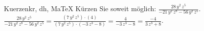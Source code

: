 \begin{MAufgabe}{Kuerzen}{kr, dh, MaTeX}
K\"urzen Sie soweit m\"oglich: $\frac{28\, y^2\, z^5}{ - 21\, y^2\, z^8 - 56\, y^2\, z^5}$.\\ 
\ifLsg\MLoesung
\quad $\frac{28\, y^2\, z^5}{ - 21\, y^2\, z^8 - 56\, y^2\, z^5}=\frac{(7\, y^2\, z^5)\cdot(4)}{(7\, y^2\, z^5)\cdot( - 3\, z^3 - 8)}=\frac{4}{ - 3\, z^3 - 8}=\frac{-4}{3\, z^3 + 8}$.\else\relax\fi
 \end{MAufgabe}